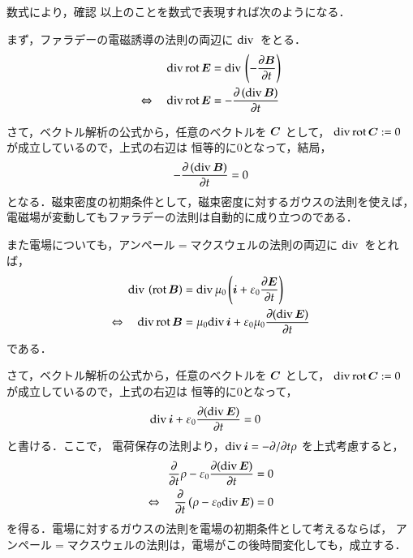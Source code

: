     \begin{mysmallsec}{数式により，確認}
        以上のことを数式で表現すれば次のようになる．

        まず，ファラデーの電磁誘導の法則の両辺に $\mathrm{div}\,$ をとる．
        \begin{align}
            \mathrm{div\,rot\,} \boldsymbol{E}
            &=\mathrm{div\,}\left( -\frac{\partial \boldsymbol{B}}{\partial t}\right) \notag \\
            \Leftrightarrow \quad
            \mathrm{div\,rot\,} \boldsymbol{E}
            &=-\frac{\partial \left(\mathrm{div\,}\boldsymbol{B}\right)}{\partial t}
        \end{align}

        さて，ベクトル解析の公式から，任意のベクトルを $\boldsymbol{C}$ として，
        $\mathrm{div\,rot\,} \boldsymbol{C}:=0$ が成立しているので，上式の右辺は
        恒等的に0となって，結局，
        \begin{align}
            -\frac{\partial \left(\mathrm{div\,}\boldsymbol{B}\right)}{\partial t} =0
        \end{align}
        となる．磁束密度の初期条件として，磁束密度に対するガウスの法則を使えば，
        電磁場が変動してもファラデーの法則は自動的に成り立つのである．

        また電場についても，アンペール$=$マクスウェルの法則の両辺に $\mathrm{div}\,$ をとれば，
        \begin{align}
            \mathrm{div\,}\left(\mathrm{rot\,}\boldsymbol{B}\right)
            &=
            \mathrm{div\,}\mu_{0}
            \left(\boldsymbol{i}+
                \varepsilon_{0}\frac{\partial \boldsymbol{E}}{\partial t}
            \right) \notag \\
            \Leftrightarrow \quad
            \mathrm{div\,rot\,}\boldsymbol{B}
            &=
            \mu_{0}\mathrm{div\,}\boldsymbol{i}+
            \varepsilon_{0}\mu_{0}\frac{\partial (\mathrm{div\,}\boldsymbol{E})}{\partial t}
        \end{align}
        である．

        さて，ベクトル解析の公式から，任意のベクトルを $\boldsymbol{C}$ として，
        $\mathrm{div\,rot\,} \boldsymbol{C}:=0$ が成立しているので，上式の右辺は
        恒等的に0となって，
        \begin{align}
            \mathrm{div\,}\boldsymbol{i}+
            \varepsilon_{0}\frac{\partial (\mathrm{div\,}\boldsymbol{E})}{\partial t}
            &=
            0
        \end{align}
        と書ける．ここで，
        電荷保存の法則より，$\mathrm{div}\,\boldsymbol{i}=-\partial/\partial t\rho$ を上式考慮すると，
        \begin{align}\label{eq:Gauss_first}
            \frac{\rd }{\rd t}\rho
            -\varepsilon_{0}\frac{\rd (\mathrm{div\,}\bE)}{\rd t}
            &=
            0 \notag \\
            \Leftrightarrow \quad
            \frac{\rd }{\rd t}
            \left(\rho
                -\varepsilon_{0}\mathrm{div\,}\bE
            \right)
            &=
            0
        \end{align}
        を得る．電場に対するガウスの法則を電場の初期条件として考えるならば，
        アンペール$=$マクスウェルの法則は，電場がこの後時間変化しても，成立する．


\end{mysmallsec}
